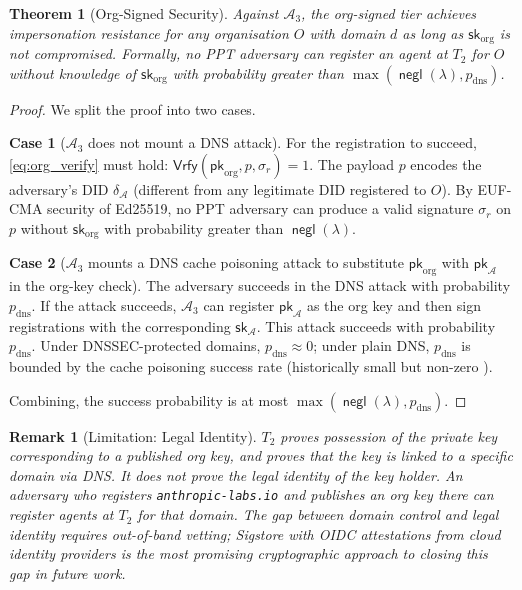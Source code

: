 \documentclass[conference]{IEEEtran}
\newtheorem{theorem}{Theorem}
\newtheorem{remark}{Remark}
\DeclareMathOperator{\negl}{\mathsf{negl}}
\newcommand{\Adv}{\mathcal{A}}
\newcommand{\pk}{\mathsf{pk}}
\newcommand{\sk}{\mathsf{sk}}
\newcommand{\sig}{\sigma}
\newcommand{\Vrfy}{\mathsf{Vrfy}}
\begin{document}
\begin{theorem}[Org-Signed Security]
\label{thm:org_signed}
Against $\Adv_3$, the org-signed tier achieves
impersonation resistance for any organisation $O$ with
domain $d$ as long as $\sk_{\text{org}}$ is not compromised.
Formally, no PPT adversary can register an agent at $T_2$
for $O$ without knowledge of $\sk_{\text{org}}$ with
probability greater than $\max(\negl(\lambda),
p_{\text{dns}})$.
\end{theorem}
\begin{proof}
We split the proof into two cases.

\textbf{Case 1} ($\Adv_3$ does not mount a DNS attack).
For the registration to succeed, \eqref{eq:org_verify}
must hold: $\Vrfy(\pk_{\text{org}}, p, \sig_r) = 1$.
The payload $p$ encodes the adversary's DID $\delta_{\Adv}$
(different from any legitimate DID registered to $O$). By
EUF-CMA security of Ed25519, no PPT adversary can produce
a valid signature $\sig_r$ on $p$ without $\sk_{\text{org}}$
with probability greater than $\negl(\lambda)$.

\textbf{Case 2} ($\Adv_3$ mounts a DNS cache poisoning attack
to substitute $\pk_{\text{org}}$ with $\pk_{\Adv}$ in the
org-key check).  The adversary succeeds in the DNS attack
with probability $p_{\text{dns}}$. If the attack succeeds,
$\Adv_3$ can register $\pk_{\Adv}$ as the org key and then
sign registrations with the corresponding $\sk_{\Adv}$.
This attack succeeds with probability $p_{\text{dns}}$.
Under DNSSEC-protected domains, $p_{\text{dns}} \approx 0$;
under plain DNS, $p_{\text{dns}}$ is bounded by the cache
poisoning success rate (historically small but non-zero
\cite{acme2019rfc}).

Combining, the success probability is at most
$\max(\negl(\lambda), p_{\text{dns}})$.
\end{proof}

\begin{remark}[Limitation: Legal Identity]
\label{rem:legal}
$T_2$ proves possession of the private key corresponding to
a published org key, and proves that the key is linked to
a specific domain via DNS. It does not prove the legal
identity of the key holder. An adversary who registers
\texttt{anthropic-labs.io} and publishes an org key there
can register agents at $T_2$ for that domain. The gap
between domain control and legal identity requires out-of-band
vetting; Sigstore \cite{sigstore2021} with OIDC attestations
from cloud identity providers is the most promising
cryptographic approach to closing this gap in future work.
\end{remark}
\end{document}
